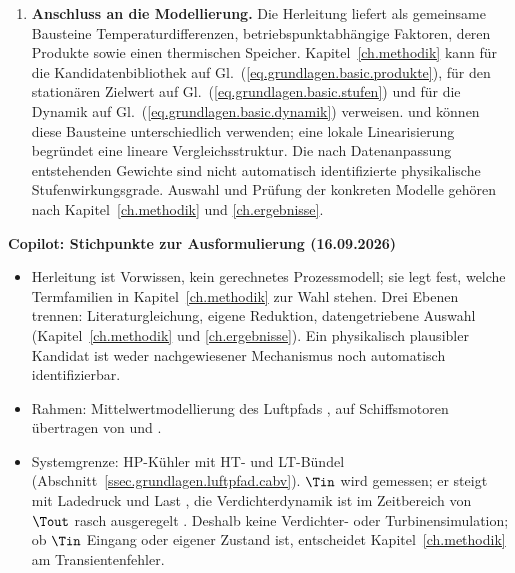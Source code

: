 \begin{enumerate}
  \item \textbf{Anschluss an die Modellierung.}
    Die Herleitung liefert als gemeinsame Bausteine
    Temperaturdifferenzen, betriebspunktabhängige Faktoren, deren
    Produkte sowie einen thermischen Speicher.
    Kapitel~\ref{ch.methodik} kann für die Kandidatenbibliothek auf
    Gl.~(\ref{eq.grundlagen.basic.produkte}), für den stationären
    Zielwert auf Gl.~(\ref{eq.grundlagen.basic.stufen}) und für die
    Dynamik auf Gl.~(\ref{eq.grundlagen.basic.dynamik}) verweisen.
    \sindyc und \edmdc können diese Bausteine unterschiedlich
    verwenden; eine lokale Linearisierung begründet eine lineare
    Vergleichsstruktur. Die nach Datenanpassung entstehenden
    Gewichte sind nicht automatisch identifizierte physikalische
    Stufenwirkungsgrade. Auswahl und Prüfung der konkreten Modelle
    gehören nach Kapitel~\ref{ch.methodik} und \ref{ch.ergebnisse}.
\end{enumerate}

\par\smallskip
\noindent\textbf{Copilot: Stichpunkte zur Ausformulierung (16.09.2026)}
\par\smallskip

\begin{itemize}
  \item Herleitung ist Vorwissen, kein gerechnetes Prozessmodell; sie legt fest,
    welche Termfamilien in Kapitel~\ref{ch.methodik} zur Wahl stehen. Drei Ebenen
    trennen: Literaturgleichung, eigene Reduktion, datengetriebene Auswahl
    (Kapitel~\ref{ch.methodik} und \ref{ch.ergebnisse}). Ein physikalisch
    plausibler Kandidat ist weder nachgewiesener Mechanismus noch automatisch
    identifizierbar.
  \item Rahmen: Mittelwertmodellierung des Luftpfads
    \cite{guzzellaIntroductionModelingControl2010,
    isermannEngineModelingControl2014}, auf Schiffsmotoren übertragen von
    \cite{theotokatosCycleMeanValue2010} und
    \cite{baldiDevelopmentCombinedMean2015}.
  \item Systemgrenze: HP-Kühler mit HT- und LT-Bündel
    (Abschnitt~\ref{ssec.grundlagen.luftpfad.cabv}). $\Tin$ wird gemessen; er
    steigt mit Ladedruck und Last \cite[S.~769--780]{baarAufladeverfahren2019},
    die Verdichterdynamik ist im Zeitbereich von $\Tout$ rasch ausgeregelt
    \cite{theotokatosCycleMeanValue2010}. Deshalb keine Verdichter- oder
    Turbinensimulation; ob $\Tin$ Eingang oder eigener Zustand ist, entscheidet
    Kapitel~\ref{ch.methodik} am Transientenfehler.
\end{itemize}


